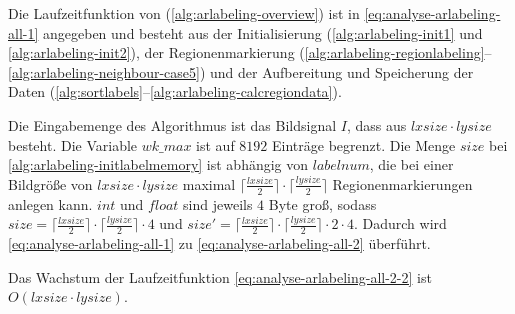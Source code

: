 Die Laufzeitfunktion von  (\autoref{alg:arlabeling-overview}) ist in
 \autoref{eq:analyse-arlabeling-all-1} angegeben und besteht aus der Initialisierung (\autoref{alg:arlabeling-init1}
 und \autoref{alg:arlabeling-init2}), der Regionenmarkierung
 (\autoref{alg:arlabeling-regionlabeling}--\autoref{alg:arlabeling-neighbour-case5}) und der Aufbereitung und
 Speicherung der Daten (\autoref{alg:sortlabels}--\autoref{alg:arlabeling-calcregiondata}).

Die Eingabemenge des Algorithmus ist das Bildsignal $I$, dass aus $\mathit{lxsize} \cdot \mathit{lysize}$ besteht. Die
 Variable $\mathit{wk\_max}$ ist auf $8192$ Einträge begrenzt. Die Menge $\mathit{size}$ bei
 \autoref{alg:arlabeling-initlabelmemory} ist abhängig von $\mathit{labelnum}$, die bei einer Bildgröße von
 $\mathit{lxsize} \cdot \mathit{lysize}$ maximal $\bigl\lceil\frac{\mathit{lxsize}}{2}\bigr\rceil
 \cdot \bigl\lceil\frac{\mathit{lysize}}{2}\bigr\rceil$ Regionenmarkierungen anlegen kann.
 $\mathit{int}$ und $\mathit{float}$ sind jeweils $4$ Byte groß, sodass
 $\mathit{size} = \bigl\lceil\frac{\mathit{lxsize}}{2}\bigr\rceil \cdot \bigl\lceil\frac{\mathit{lysize}}{2}\bigr\rceil
 \cdot 4$ und $\mathit{size}' = \bigl\lceil\frac{\mathit{lxsize}}{2}\bigr\rceil
 \cdot \bigl\lceil\frac{\mathit{lysize}}{2}\bigr\rceil \cdot 2 \cdot 4$.
Dadurch wird \autoref{eq:analyse-arlabeling-all-1} zu \autoref{eq:analyse-arlabeling-all-2} überführt.

Das Wachstum der Laufzeitfunktion \autoref{eq:analyse-arlabeling-all-2-2} ist $O(\mathit{lxsize\cdot\mathit{lysize}})$.
